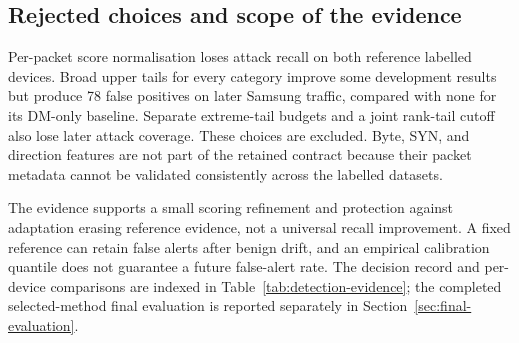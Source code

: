 \subsection{Rejected choices and scope of the evidence}

Per-packet score normalisation loses attack recall on both reference labelled
devices. Broad upper tails for every category improve some development results
but produce 78 false positives on later Samsung traffic, compared with none
for its DM-only baseline. Separate extreme-tail budgets and a joint rank-tail
cutoff also lose later attack coverage. These choices are excluded. Byte, SYN,
and direction features are not part of the retained contract because their
packet metadata cannot be validated consistently across the labelled datasets.

The evidence supports a small scoring refinement and protection against
adaptation erasing reference evidence, not a universal recall improvement.
A fixed reference can retain false alerts after benign drift, and an empirical
calibration quantile does not guarantee a future false-alert rate. The decision
record and per-device comparisons are indexed in Table~\ref{tab:detection-evidence};
the completed selected-method final evaluation is reported separately in
Section~\ref{sec:final-evaluation}.
